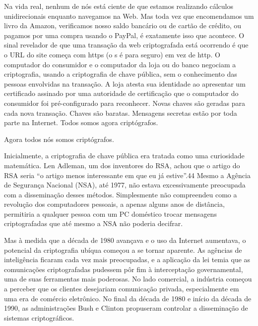\documentclass{book}
\begin{document}
Na vida real, nenhum de nós está ciente de que estamos realizando cálculos unidirecionais enquanto navegamos na Web. Mas toda vez que encomendamos um livro da Amazon, verificamos nosso saldo bancário ou de cartão de crédito, ou pagamos por uma compra usando o PayPal, é exatamente isso que acontece. O sinal revelador de que uma transação da web criptografada está ocorrendo é que o URL do site começa com https (o s é para seguro) em vez de http. O computador do consumidor e o computador da loja ou do banco negociam a criptografia, usando a criptografia de chave pública, sem o conhecimento das pessoas envolvidas na transação. A loja atesta sua identidade ao apresentar um certificado assinado por uma autoridade de certificação que o computador do consumidor foi pré-configurado para reconhecer. Novas chaves são geradas para cada nova transação. Chaves são baratas. Mensagens secretas estão por toda parte na Internet. Todos somos agora criptógrafos.

Agora todos nós somos criptógrafos.

Inicialmente, a criptografia de chave pública era tratada como uma curiosidade matemática. Len Adleman, um dos inventores do RSA, achou que o artigo do RSA seria ``o artigo menos interessante em que eu já estive''.44 Mesmo a Agência de Segurança Nacional (NSA), até 1977, não estava excessivamente preocupada com a disseminação desses métodos. Simplesmente não compreendeu como a revolução dos computadores pessoais, a apenas alguns anos de distância, permitiria a qualquer pessoa com um PC doméstico trocar mensagens criptografadas que até mesmo a NSA não poderia decifrar.

Mas à medida que a década de 1980 avançava e o uso da Internet aumentava, o potencial da criptografia ubíqua começou a se tornar aparente. As agências de inteligência ficaram cada vez mais preocupadas, e a aplicação da lei temia que as comunicações criptografadas pudessem pôr fim à interceptação governamental, uma de suas ferramentas mais poderosas. No lado comercial, a indústria começou a perceber que os clientes desejariam comunicação privada, especialmente em uma era de comércio eletrônico. No final da década de 1980 e início da década de 1990, as administrações Bush e Clinton propuseram controlar a disseminação de sistemas criptográficos.
\end{document}
